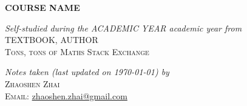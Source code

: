 \pagestyle{empty}
\begin{center}
    \Large\textbf{\textsc{COURSE NAME}}
\end{center}
\vspace*{0.03\textheight}
\begin{minipage}[t]{0.5\textwidth}
    \centering
    {\large\textit{Self-studied during the ACADEMIC YEAR academic year from}}
    \\[\baselineskip]
    {\textsc{TEXTBOOK}, AUTHOR}
    \\[0.3\baselineskip]
    {\textsc{Tons, tons of Maths Stack Exchange}}
\end{minipage}
\begin{minipage}[t]{0.5\textwidth}
    \centering
    {\large\textit{Notes taken (last updated on \today) by}}
    \\[\baselineskip]
    {\textsc{Zhaoshen Zhai}}
    \\[0.3\baselineskip]
    {\textsc{Email: }\url{zhaoshen.zhai@gmail.com}}
\end{minipage}
\\[2\baselineskip]
\begin{center}
    \textsc{\bfseries\contentsname}
\end{center}

\toccontents
\clearpage
\pagestyle{fancyplain}
\fancyhead[L,C,R]{}
\fancyfoot[L,R]{}
\fancyfoot[C]{\thepage}
\renewcommand{\headrulewidth}{0pt}
\setcounter{page}{1}
